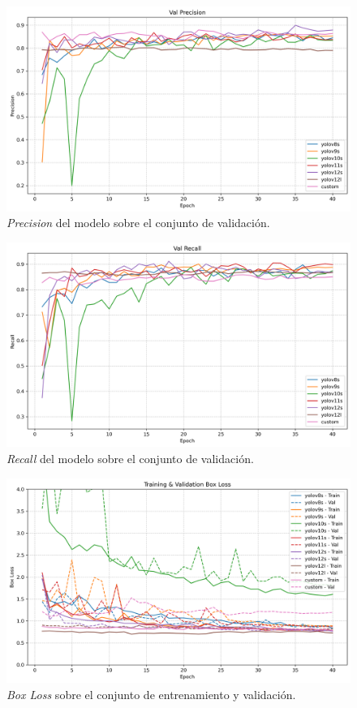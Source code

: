 \documentclass[12pt,a4paper,onecolumn,oneside]{report}
\begin{document}
\begin{figure}[H]
  \centering
  \includegraphics[width=1.0\textwidth]{figuras/yolo_plots/precision.png}
  \caption{\textit{Precision} del modelo sobre el conjunto de validación.}
  \label{fig:yolo_train_precision}
\end{figure}

\begin{figure}[H]
  \centering
  \includegraphics[width=1.0\textwidth]{figuras/yolo_plots/recall.png}
  \caption{\textit{Recall} del modelo sobre el conjunto de validación.}
  \label{fig:yolo_train_recall}
\end{figure}

\begin{figure}[H]
  \centering
  \includegraphics[width=1.0\textwidth]{figuras/yolo_plots/box_loss.png}
  \caption{\textit{Box Loss} sobre el conjunto de entrenamiento y validación.}
  \label{fig:yolo_train_box_loss}
\end{figure}
\end{document}
